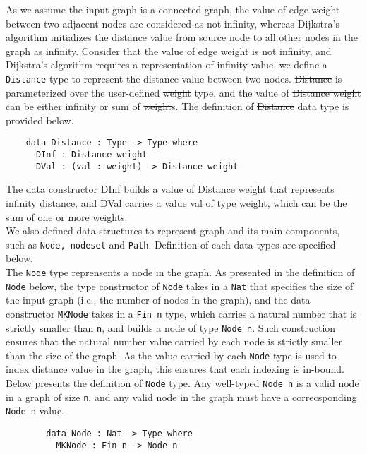 As we assume the input graph is a connected graph, the value of edge weight between two adjacent nodes are considered as not infinity, whereas Dijkstra's algorithm initializes the distance value from source node to all other nodes in the graph as infinity. Consider that the value of edge weight is not infinity, and Dijkstra's algorithm requires a representation of infinity value, we define a \texttt{Distance} type to represent the distance value between two nodes. \st{Distance} is parameterized over the user-defined \st{weight} type, and the value of \st{Distance weight} can be either infinity or sum of \st{weight}s. The definition of \st{Distance} data type is provided below. 
\begin{lstlisting}
    data Distance : Type -> Type where
      DInf : Distance weight
      DVal : (val : weight) -> Distance weight
\end{lstlisting}

The data constructor \st{DInf} builds a value of \st{Distance weight} that represents infinity distance, and \st{DVal} carries a value \st{val} of type \st{weight}, which can be the sum of one or more \st{weight}s. 
\\

We also defined data structures to represent graph and its main components, such as \texttt{Node, nodeset} and \texttt{Path}. Definition of each data types are specified below. 
\\

The \texttt{Node} type reprensents a node in the graph. As presented in the definition of \texttt{Node} below, the type constructor of \texttt{Node} takes in a \texttt{Nat} that specifies the size of the input graph (i.e., the number of nodes in the graph), and the data constructor \texttt{MKNode} takes in a \texttt{Fin n} type, which carries a natural number that is strictly smaller than \texttt{n}, and builds a node of type \texttt{Node n}. Such construction ensures that the natural number value carried by each node is strictly smaller than the size of the graph. As the value carried by each \texttt{Node} type is used to index distance value in the graph, this ensures that each indexing is in-bound. Below presents the definition of \texttt{Node} type. Any well-typed \texttt{Node n} is a valid node in a graph of size \texttt{n}, and any valid node in the graph must have a correcsponding \texttt{Node n} value. 

\begin{lstlisting}
		data Node : Nat -> Type where
		  MKNode : Fin n -> Node n
\end{lstlisting}

